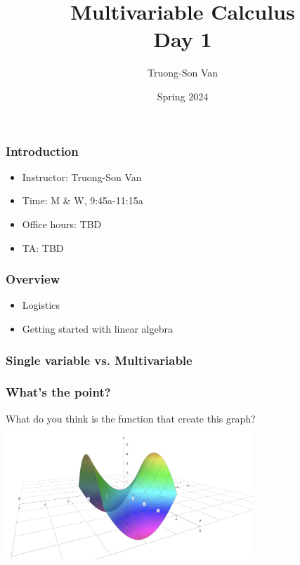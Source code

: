 \documentclass[aspectratio=169]{beamer}
\title{ Multivariable Calculus \\ Day 1}
\institute{Fulbright University Vietnam}
\author{Truong-Son Van}
\date{Spring 2024}
\begin{document}
\maketitle


\begin{frame}
    \frametitle{Introduction}
    \begin{itemize}
        \item Instructor: Truong-Son Van
        \item Time: M \& W, 9:45a-11:15a
        \item Office hours: TBD 
        \item TA:  TBD
    \end{itemize}
\end{frame}

\begin{frame}
    \frametitle{Overview}
    \begin{itemize}
        \item Logistics
        \item Getting started with linear algebra
    \end{itemize}
\end{frame}

\begin{frame}
    \frametitle{Single variable vs. Multivariable}

\end{frame}

\begin{frame}
    \frametitle{What's the point?}
    What do you think is the function that create this graph?
    \centering
    \includegraphics[width=0.7\textwidth]{saddle}
\end{frame}
\end{document}

